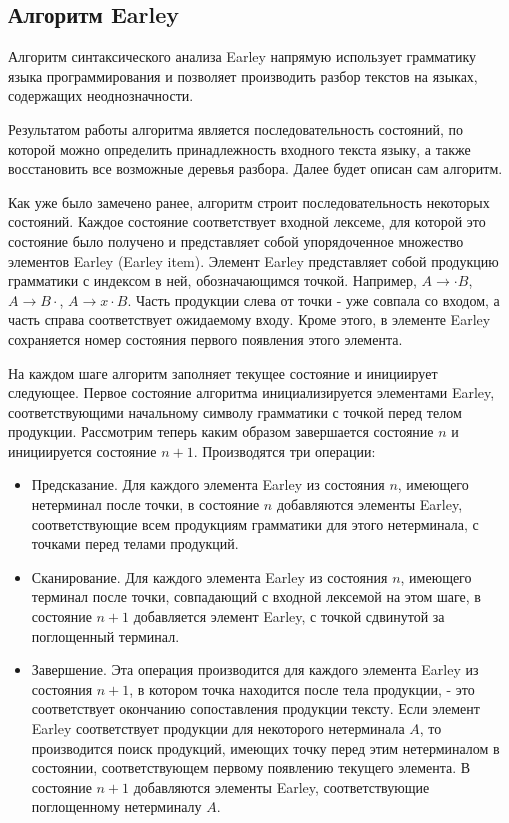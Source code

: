 \subsection{Алгоритм Earley}
Алгоритм синтаксического анализа Earley напрямую использует грамматику языка программирования и позволяет производить разбор текстов на языках, содержащих неоднозначности.

Результатом работы алгоритма является последовательность состояний, по которой можно определить принадлежность входного текста языку, а также восстановить все возможные деревья разбора. Далее будет описан сам алгоритм.

Как уже было замечено ранее, алгоритм строит последовательность некоторых состояний. Каждое состояние соответствует входной лексеме, для которой это состояние было получено и представляет собой упорядоченное множество элементов Earley (Earley item). Элемент Earley представляет собой продукцию грамматики с индексом в ней, обозначающимся точкой. Например, $A \to \cdot B$, $A \to B \cdot $, $A \to x \cdot B$. Часть продукции слева от точки - уже совпала со входом, а часть справа соответствует ожидаемому входу. Кроме этого, в элементе Earley сохраняется номер состояния первого появления этого элемента.

На каждом шаге алгоритм заполняет текущее состояние и инициирует следующее. Первое состояние алгоритма инициализируется элементами Earley, соответствующими начальному символу грамматики с точкой перед телом продукции. Рассмотрим теперь каким образом завершается состояние $n$ и инициируется состояние $n+1$. Производятся три операции:

\begin{itemize}

\item Предсказание. Для каждого элемента Earley из состояния $n$, имеющего нетерминал после точки, в состояние $n$ добавляются элементы Earley, соответствующие всем продукциям грамматики для этого нетерминала, с точками перед телами продукций.

\item Сканирование. Для каждого элемента Earley из состояния $n$, имеющего терминал после точки, совпадающий с входной лексемой на этом шаге, в состояние $n+1$ добавляется элемент Earley, с точкой сдвинутой за поглощенный терминал.

\item Завершение. Эта операция производится для каждого элемента Earley из состояния $n+1$, в котором точка находится после тела продукции, - это соответствует окончанию сопоставления продукции тексту. Если элемент Earley соответствует продукции для некоторого нетерминала $A$, то производится поиск продукций, имеющих точку перед этим нетерминалом в состоянии, соответствующем первому появлению текущего элемента. В состояние $n+1$ добавляются элементы Earley, соответствующие поглощенному нетерминалу $A$.

\end{itemize}

